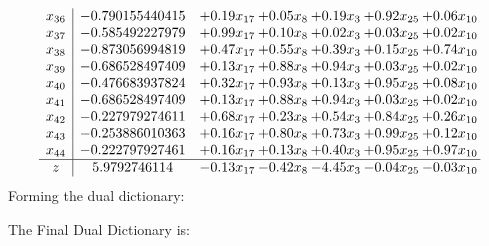 \documentclass[8pt]{article}
\begin{document}
\[\begin{array}{c| c c@{\hskip 2pt} c@{\hskip 2pt} c@{\hskip 2pt} c@{\hskip 2pt} c@{\hskip 2pt} }
 x_{36}   &  -0.790155440415 & +  0.19 x_{17} & +  0.05 x_{8} & +  0.19 x_{3} & +  0.92 x_{25} & +  0.06 x_{10}\\
 x_{37}   &  -0.585492227979 & +  0.99 x_{17} & +  0.10 x_{8} & +  0.02 x_{3} & +  0.03 x_{25} & +  0.02 x_{10}\\
 x_{38}   &  -0.873056994819 & +  0.47 x_{17} & +  0.55 x_{8} & +  0.39 x_{3} & +  0.15 x_{25} & +  0.74 x_{10}\\
 x_{39}   &  -0.686528497409 & +  0.13 x_{17} & +  0.88 x_{8} & +  0.94 x_{3} & +  0.03 x_{25} & +  0.02 x_{10}\\
 x_{40}   &  -0.476683937824 & +  0.32 x_{17} & +  0.93 x_{8} & +  0.13 x_{3} & +  0.95 x_{25} & +  0.08 x_{10}\\
 x_{41}   &  -0.686528497409 & +  0.13 x_{17} & +  0.88 x_{8} & +  0.94 x_{3} & +  0.03 x_{25} & +  0.02 x_{10}\\
 x_{42}   &  -0.227979274611 & +  0.68 x_{17} & +  0.23 x_{8} & +  0.54 x_{3} & +  0.84 x_{25} & +  0.26 x_{10}\\
 x_{43}   &  -0.253886010363 & +  0.16 x_{17} & +  0.80 x_{8} & +  0.73 x_{3} & +  0.99 x_{25} & +  0.12 x_{10}\\
 x_{44}   &  -0.222797927461 & +  0.16 x_{17} & +  0.13 x_{8} & +  0.40 x_{3} & +  0.95 x_{25} & +  0.97 x_{10}\\
\hline
z    &  5.9792746114 & -0.13 x_{17} & -0.42 x_{8} & -4.45 x_{3} & -0.04 x_{25} & -0.03 x_{10}\\
\end{array}\]
Forming the dual dictionary:

The Final Dual Dictionary is: 
\end{document}
